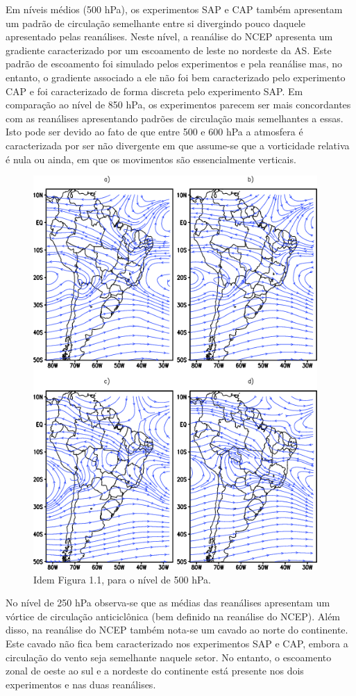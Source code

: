 Em níveis médios (500 hPa), os experimentos SAP e CAP também apresentam um padrão de circulação semelhante entre si divergindo pouco daquele apresentado pelas reanálises. Neste nível, a reanálise do NCEP apresenta um gradiente caracterizado por um escoamento de leste no nordeste da AS. Este padrão de escoamento foi simulado pelos experimentos e pela reanálise mas, no entanto, o gradiente associado a ele não foi bem caracterizado pelo experimento CAP e foi caracterizado de forma discreta pelo experimento SAP. Em comparação ao nível de 850 hPa, os experimentos parecem ser mais concordantes com as reanálises apresentando padrões de circulação mais semelhantes a essas. Isto pode ser devido ao fato de que entre 500 e 600 hPa a atmosfera é caracterizada por ser não divergente em que assume-se que a vorticidade relativa é nula ou ainda, em que os movimentos são essencialmente verticais.

\begin{figure}[!hbp]
\centering
\includegraphics[height=15cm]{./figs/media_corrente_anl_500hPa.png}
\caption{Idem Figura 1.1, para o nível de 500 hPa.}
\label{fig32}
\end{figure}

No nível de 250 hPa observa-se que as médias das reanálises apresentam um vórtice de circulação anticiclônica (bem definido na reanálise do NCEP). Além disso, na reanálise do NCEP também nota-se um cavado ao norte do continente. Este cavado não fica bem caracterizado nos experimentos SAP e CAP, embora a circulação do vento seja semelhante naquele setor. No entanto, o escoamento zonal de oeste ao sul e a nordeste do continente está presente nos dois experimentos e nas duas reanálises.

